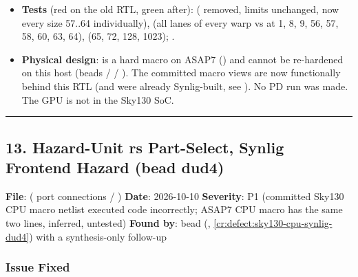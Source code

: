 \begin{record}
\begin{itemize}
  / and the grid dimensions are stored but
  unused in Phase 4, and there is no active-warps perf counter.
\item
  \textbf{Tests} (red on the old RTL, green after):
   
  ( removed, limits unchanged, now every size 57..64
  individually),  (all lanes of
  every warp vs  at  1, 8, 9, 56, 57,
  58, 60, 63, 64),  (65, 72, 128,
  1023); 
  .
\item
  \textbf{Physical design}:  is a hard macro on ASAP7
  () and cannot be re-hardened on
  this host (beads  /  / ). The committed
  macro views are now functionally behind this RTL (and were already
  Synlig-built, see ). No PD run was made. The GPU is not in
  the Sky130 SoC.
\end{itemize}

\begin{center}\rule{0.5\linewidth}{0.5pt}\end{center}

\end{record}

\subsection{13. Hazard-Unit rs Part-Select, Synlig Frontend Hazard (bead
dud4)}\label{cr:fix:fixes-index:13-hazard-unit-rs-part-select-synlig-frontend-hazard-bead-dud4}

\begin{record}

\textbf{File}:  ( port
connections  / )
\textbf{Date}: 2026-10-10 \textbf{Severity}: P1 (committed Sky130 CPU
macro netlist executed code incorrectly; ASAP7 CPU macro has the same
two lines, inferred, untested) \textbf{Found by}: bead  (,
\cref{cr:defect:sky130-cpu-synlig-dud4}) with a synthesis-only follow-up

\end{record}

\subsubsection{Issue Fixed}\label{cr:fix:fixes-index:issue-fixed-6}

